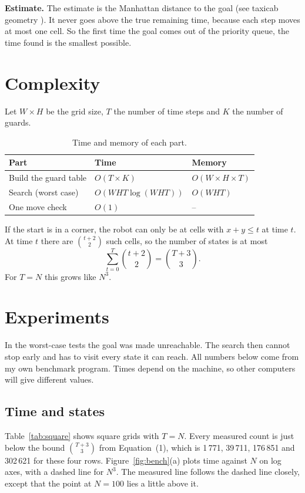 \documentclass[10pt,letterpaper]{article}
\begin{document}
\textbf{Estimate.} The estimate is the Manhattan distance to the goal (see taxicab geometry \cite{wiki_taxicab}). It never goes above the true remaining time, because each step moves at most one cell. So the first time the goal comes out of the priority queue, the time found is the smallest possible.

\section{Complexity}

Let $W \times H$ be the grid size, $T$ the number of time steps and $K$ the number of guards.

\begin{table}[!ht]
\centering
\caption{Time and memory of each part.}
\label{tab:complexity}
\begin{tabular}{lll}
\toprule
Part & Time & Memory \\
\midrule
Build the guard table & $O(T \times K)$ & $O(W \times H \times T)$ \\
Search (worst case) & $O(W H T \log(W H T))$ & $O(W H T)$ \\
One move check & $O(1)$ & -- \\
\bottomrule
\end{tabular}
\end{table}

If the start is in a corner, the robot can only be at cells with $x + y \le t$ at time $t$. At time $t$ there are $\binom{t+2}{2}$ such cells, so the number of states is at most
\begin{equation}
\sum_{t=0}^{T} \binom{t+2}{2} = \binom{T+3}{3}.
\end{equation}
For $T = N$ this grows like $N^3$.

\section{Experiments}

In the worst-case tests the goal was made unreachable. The search then cannot stop early and has to visit every state it can reach. All numbers below come from my own benchmark program. Times depend on the machine, so other computers will give different values.

\subsection{Time and states}

Table~\ref{tab:square} shows square grids with $T = N$. Every measured count is just below the bound $\binom{T+3}{3}$ from Equation~(1), which is 1\,771, 39\,711, 176\,851 and 302\,621 for these four rows. Figure~\ref{fig:bench}(a) plots time against $N$ on log axes, with a dashed line for $N^3$. The measured line follows the dashed line closely, except that the point at $N = 100$ lies a little above it.
\end{document}
